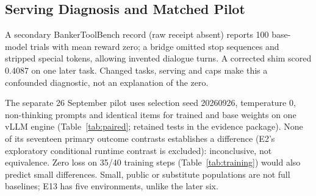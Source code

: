 \documentclass[a4paper,runningheads]{llncs}
\begin{document}
\subsection{Serving Diagnosis and Matched Pilot}
\label{sec:paired}
A secondary BankerToolBench record (raw receipt absent) reports 100
base-model trials with mean reward zero; a bridge omitted stop sequences and
stripped special tokens, allowing invented dialogue turns. A
corrected shim scored 0.4087 on one later task. Changed tasks, serving and caps
make this a confounded diagnostic, not an explanation of the zero.

The separate 26 September pilot uses selection seed 20260926, temperature 0,
non-thinking prompts and identical items for trained and base weights on one
vLLM engine (Table~\ref{tab:paired}; retained tests in the evidence package).
None of its seventeen primary outcome contrasts establishes a difference
(E2's exploratory conditional runtime contrast is excluded): inconclusive, not
equivalence. Zero loss on 35/40 training steps (Table~\ref{tab:training})
would also predict small differences. Small, public or substitute populations
are not full baselines; E13 has five environments, unlike the later six.
\end{document}
